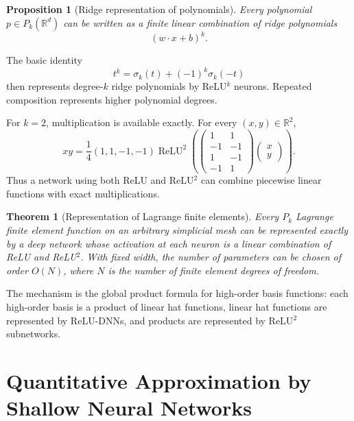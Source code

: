 \documentclass[11pt,a4paper]{article}
\newcommand{\R}{\mathbb{R}}
\newcommand{\ReLU}{\operatorname{ReLU}}
\theoremstyle{definition}
\theoremstyle{plain}
\newtheorem{theorem}{Theorem}[section]
\theoremstyle{remark}
\theoremstyle{plain}
\newtheorem{proposition}{Proposition}[section]
\begin{document}
\begin{proposition}[Ridge representation of polynomials]
Every polynomial $p\in P_k(\R^d)$ can be written as a finite linear combination of ridge polynomials
\[
  (w\cdot x+b)^k.
\]
\end{proposition}

The basic identity
\[
  t^k=\sigma_k(t)+(-1)^k\sigma_k(-t)
\]
then represents degree-$k$ ridge polynomials by ReLU$^k$ neurons. Repeated composition represents higher polynomial degrees.

For $k=2$, multiplication is available exactly. For every $(x,y)\in\R^2$,
\[
  xy=\frac14(1,1,-1,-1)
  \ReLU^2\!\left(
  \begin{pmatrix}
  1&1\\
  -1&-1\\
  1&-1\\
  -1&1
  \end{pmatrix}
  \begin{pmatrix}x\\y\end{pmatrix}
  \right).
\]
Thus a network using both ReLU and ReLU$^2$ can combine piecewise linear functions with exact multiplications.

\begin{theorem}[Representation of Lagrange finite elements]
Every $P_k$ Lagrange finite element function on an arbitrary simplicial mesh can be represented exactly by a deep network whose activation at each neuron is a linear combination of ReLU and ReLU$^2$. With fixed width, the number of parameters can be chosen of order $O(N)$, where $N$ is the number of finite element degrees of freedom.
\end{theorem}

The mechanism is the global product formula for high-order basis functions: each high-order basis is a product of linear hat functions, linear hat functions are represented by ReLU-DNNs, and products are represented by ReLU$^2$ subnetworks.

\section{Quantitative Approximation by Shallow Neural Networks}
\end{document}
